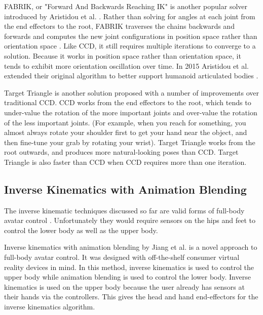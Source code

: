 \documentclass{vgtc}                          %
\begin{document}
    FABRIK, or "Forward And Backwards Reaching IK" is another popular solver introduced by Aristidou et al. \cite{FabrikOG}. Rather than solving for angles at each joint from the end effectors to the root, FABRIK traverses the chains backwards and forwards and computes the new joint configurations in position space rather than orientation space \cite{ReviewNewFast}. Like CCD, it still requires multiple iterations to converge to a solution. Because it works in position space rather than orientation space, it tends to exhibit more orientation oscillation over time. In 2015 Aristidou et al. extended their original algorithm to better support humanoid articulated bodies \cite{FabrikHuman}.
    
    Target Triangle \cite{FastIK} is another solution proposed with a number of improvements over traditional CCD. CCD works from the end effectors to the root, which tends to under-value the rotation of the more important joints and over-value the rotation of the less important joints. (For example, when you reach for something, you almost always rotate your shoulder first to get your hand near the object, and then fine-tune your grab by rotating your wrist). Target Triangle works from the root outwards, and produces more natural-looking poses than CCD. Target Triangle is also faster than CCD when CCD requires more than one iteration.
    
    
\subsection{Inverse Kinematics with Animation Blending}
\label{ikwithanim}
    The inverse kinematic techniques discussed so far are valid forms of full-body avatar control  \cite{Analysis, simplified, On}. Unfortunately they would require sensors on the hips and feet to control the lower body as well as the upper body.

     Inverse kinematics with animation blending by Jiang et al. \cite{Real-Time} is a novel approach to full-body avatar control. It was designed with off-the-shelf consumer virtual reality devices in mind. In this method, inverse kinematics is used to control the upper body while animation blending is used to control the lower body. Inverse kinematics is used on the upper body because the user already has sensors at their hands via the controllers. This gives the head and hand end-effectors for the inverse kinematics algorithm.
    
\end{document}
